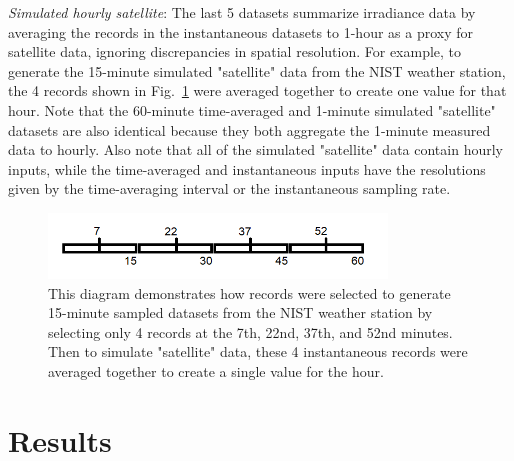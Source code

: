\documentclass[conference]{IEEEtran}
\begin{document}
\emph{Simulated hourly satellite}: The last 5 datasets summarize irradiance data by averaging the records in the instantaneous datasets to 1-hour as a proxy for satellite data, ignoring discrepancies in spatial resolution. For example, to generate the 15-minute simulated "satellite" data from the NIST weather station, the 4 records shown in Fig.~\ref{fig:sampling-diagram} were averaged together to create one value for that hour. Note that the 60-minute time-averaged and 1-minute simulated "satellite" datasets are also identical because they both aggregate the 1-minute measured data to hourly. Also note that all of the simulated "satellite" data contain hourly inputs, while the time-averaged and instantaneous inputs have the resolutions given by the time-averaging interval or the instantaneous sampling rate.

\begin{figure}[htbp]
\centerline{\includegraphics[width=9cm]{sampling-diagram.png}}
\caption{This diagram demonstrates how records were selected to generate 15-minute sampled datasets from the NIST weather station by selecting only 4 records at the 7th, 22nd, 37th, and 52nd minutes. Then to simulate "satellite" data, these 4 instantaneous records were averaged together to create a single value for the hour.}
\label{fig:sampling-diagram}
\end{figure}

\section{Results}
\label{section:results}
\end{document}
